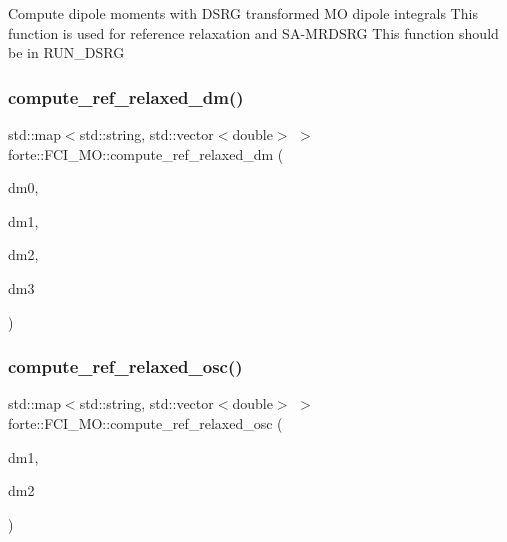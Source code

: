 Compute dipole moments with D\+S\+RG transformed MO dipole integrals This function is used for reference relaxation and S\+A-\/\+M\+R\+D\+S\+RG This function should be in R\+U\+N\+\_\+\+D\+S\+RG \mbox{\label{classforte_1_1_f_c_i___m_o_afe228e464539487b4999390a0b14e42e}} 
\subsubsection{\texorpdfstring{compute\+\_\+ref\+\_\+relaxed\+\_\+dm()}{compute\_ref\_relaxed\_dm()}\hspace{0.1cm}{\footnotesize\ttfamily [2/2]}}
{\footnotesize\ttfamily std\+::map$<$std\+::string, std\+::vector$<$double$>$ $>$ forte\+::\+F\+C\+I\+\_\+\+M\+O\+::compute\+\_\+ref\+\_\+relaxed\+\_\+dm (\begin{DoxyParamCaption}\item[{const std\+::vector$<$ double $>$ \&}]{dm0,  }\item[{std\+::vector$<$ ambit\+::\+Blocked\+Tensor $>$ \&}]{dm1,  }\item[{std\+::vector$<$ ambit\+::\+Blocked\+Tensor $>$ \&}]{dm2,  }\item[{std\+::vector$<$ ambit\+::\+Blocked\+Tensor $>$ \&}]{dm3 }\end{DoxyParamCaption})}

\mbox{\label{classforte_1_1_f_c_i___m_o_a0c1b789424ac9c0139758cc1d7de07c4}} 
\subsubsection{\texorpdfstring{compute\+\_\+ref\+\_\+relaxed\+\_\+osc()}{compute\_ref\_relaxed\_osc()}\hspace{0.1cm}{\footnotesize\ttfamily [1/2]}}
{\footnotesize\ttfamily std\+::map$<$std\+::string, std\+::vector$<$double$>$ $>$ forte\+::\+F\+C\+I\+\_\+\+M\+O\+::compute\+\_\+ref\+\_\+relaxed\+\_\+osc (\begin{DoxyParamCaption}\item[{std\+::vector$<$ ambit\+::\+Blocked\+Tensor $>$ \&}]{dm1,  }\item[{std\+::vector$<$ ambit\+::\+Blocked\+Tensor $>$ \&}]{dm2 }\end{DoxyParamCaption})}

